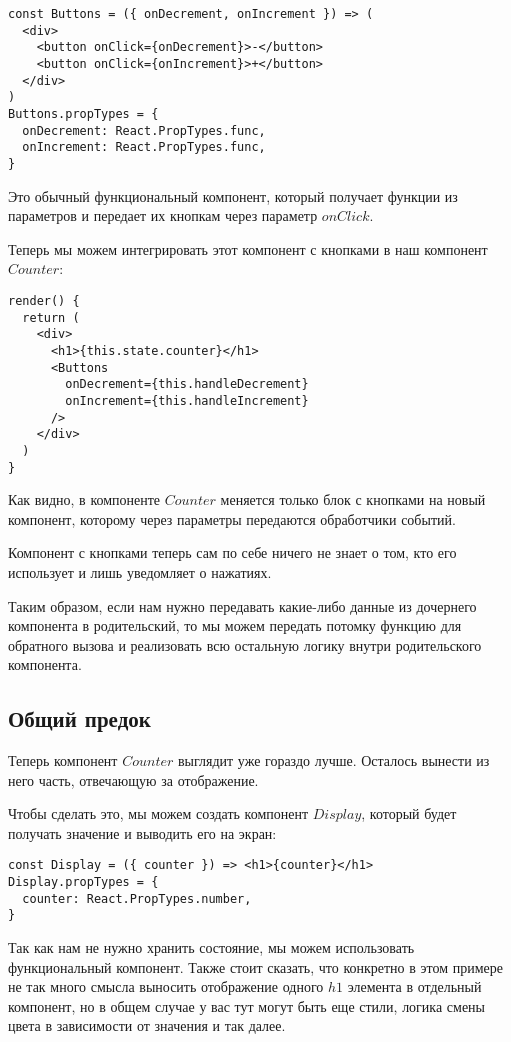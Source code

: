 \begin{lstlisting}	
const Buttons = ({ onDecrement, onIncrement }) => (
  <div>
    <button onClick={onDecrement}>-</button>
    <button onClick={onIncrement}>+</button>
  </div>
)
Buttons.propTypes = {
  onDecrement: React.PropTypes.func,
  onIncrement: React.PropTypes.func,
}
\end{lstlisting}

Это обычный функциональный компонент, который получает функции из параметров и передает их кнопкам через параметр $onClick$.

Теперь мы можем интегрировать этот компонент с кнопками в наш компонент $Counter$:

\begin{lstlisting}
render() {
  return (
    <div>
      <h1>{this.state.counter}</h1>
      <Buttons
        onDecrement={this.handleDecrement}
        onIncrement={this.handleIncrement}
      />
    </div>
  )
}
\end{lstlisting}

Как видно, в компоненте $Counter$ меняется только блок с кнопками на новый компонент, которому через параметры передаются обработчики событий.

Компонент с кнопками теперь сам по себе ничего не знает о том, кто его использует и лишь уведомляет о нажатиях.

Таким образом, если нам нужно передавать какие-либо данные из дочернего компонента в родительский, то мы можем передать потомку функцию для обратного вызова и реализовать всю остальную логику внутри родительского компонента.

\subsection{Общий предок}

Теперь компонент $Counter$ выглядит уже гораздо лучше. Осталось вынести из него часть, отвечающую за отображение. 

Чтобы сделать это, мы можем создать компонент $Display$, который будет получать значение и выводить его на экран:

\begin{lstlisting}
const Display = ({ counter }) => <h1>{counter}</h1>
Display.propTypes = {
  counter: React.PropTypes.number,
}
\end{lstlisting}

Так как нам не нужно хранить состояние, мы можем использовать функциональный компонент. Также стоит сказать, что конкретно в этом примере не так много смысла выносить отображение одного $h1$ элемента в отдельный компонент, но в общем случае у вас тут могут быть еще стили, логика смены цвета в зависимости от значения и так далее.

